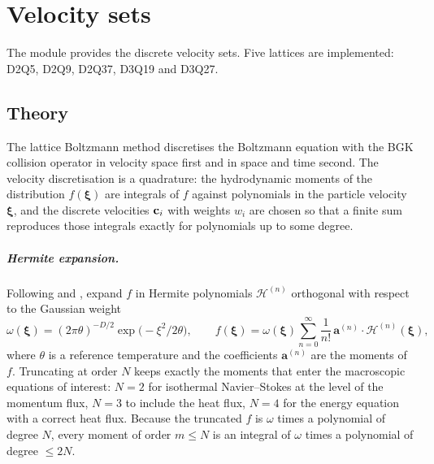 
\chapter{Velocity sets}

\label{Chapter3}

The module  provides the discrete velocity sets. Five lattices
are implemented: D2Q5, D2Q9, D2Q37, D3Q19 and D3Q27.


\section{Theory}\label{sec:lattice-theory}

The lattice Boltzmann method discretises the Boltzmann equation with the BGK collision
operator \parencite{BGK1954,QianHumieresLallemand1992,HeLuo1997} in velocity space first and
in space and time second. The velocity discretisation is a quadrature: the hydrodynamic
moments of the distribution $f(\boldsymbol{\xi})$ are integrals of $f$ against polynomials
in the particle velocity $\boldsymbol{\xi}$, and the discrete velocities $\mathbf{c}_i$ with weights
$w_i$ are chosen so that a finite sum reproduces those integrals exactly for polynomials up
to some degree.

\paragraph{Hermite expansion.}
Following \textcite{Grad1949} and \textcite{ShanYuanChen2006}, expand $f$ in Hermite
polynomials $\mathcal{H}^{(n)}$ orthogonal with respect to the Gaussian weight
\[
\omega(\boldsymbol{\xi}) = (2\pi\theta)^{-D/2}\exp\!\big(-\xi^2/2\theta\big),
\qquad
f(\boldsymbol{\xi}) = \omega(\boldsymbol{\xi})\sum_{n=0}^{\infty}\frac{1}{n!}\,
\mathbf{a}^{(n)}\!\cdot\mathcal{H}^{(n)}(\boldsymbol{\xi}),
\]
where $\theta$ is a reference temperature and the coefficients $\mathbf{a}^{(n)}$ are
the moments of $f$. Truncating at order $N$ keeps exactly the moments that enter the
macroscopic equations of interest: $N=2$ for isothermal Navier--Stokes at the level of the
momentum flux, $N=3$ to include the heat flux, $N=4$ for the energy equation with a correct
heat flux. Because the truncated $f$ is $\omega$ times a polynomial of degree $N$, every
moment of order $m \le N$ is an integral of $\omega$ times a polynomial of degree $\le 2N$.


